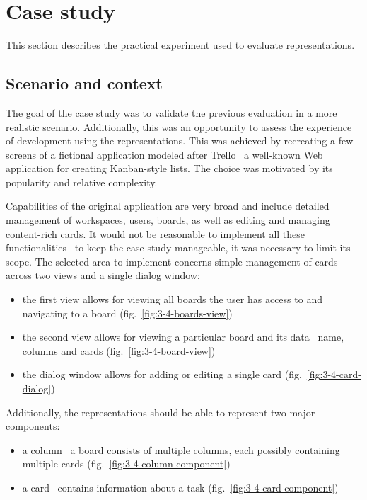 \section{Case study}\label{sec:case-study}
This section describes the practical experiment used to evaluate representations.

\subsection{Scenario and context}\label{subsec:scenario-and-context}
The goal of the case study was to validate the previous evaluation in a more realistic scenario.
Additionally, this was an opportunity to assess the experience of development using the representations.
This was achieved by recreating a few screens of a fictional application modeled after Trello \textendash\ a well-known Web application for creating Kanban-style lists.
The choice was motivated by its popularity and relative complexity.

Capabilities of the original application are very broad and include detailed management of workspaces, users, boards, as well as editing and managing content-rich cards.
It would not be reasonable to implement all these functionalities \textendash\ to keep the case study manageable, it was necessary to limit its scope.
The selected area to implement concerns simple management of cards across two views and a single dialog window:
\begin{itemize}
    \item the first view allows for viewing all boards the user has access to and navigating to a board (fig.~\ref{fig:3-4-boards-view})
    \item the second view allows for viewing a particular board and its data \textendash\ name, columns and cards (fig.~\ref{fig:3-4-board-view})
    \item the dialog window allows for adding or editing a single card (fig.~\ref{fig:3-4-card-dialog})
\end{itemize}
Additionally, the representations should be able to represent two major components:
\begin{itemize}
    \item a column \textendash\ a board consists of multiple columns, each possibly containing multiple cards (fig.~\ref{fig:3-4-column-component})
    \item a card \textendash\ contains information about a task (fig.~\ref{fig:3-4-card-component})
\end{itemize}

